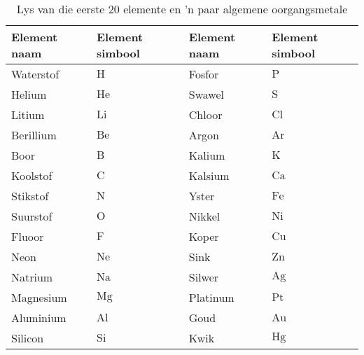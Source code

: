 \begin{table}[h!]
\label{tab:elements}
\begin{center}
\begin{tabular}{|l|l|l|l|}\hline
\textbf{Element naam} & \textbf{Element simbool} & \textbf{Element naam} & \textbf{Element simbool} \\ \hline
Waterstof & $\text{H}$ & Fosfor & $\text{P}$  \\ \hline
Helium & $\text{He}$ & Swawel & $\text{S}$ \\ \hline
Litium & $\text{Li}$ & Chloor & $\text{Cl}$ \\ \hline
Berillium & $\text{Be}$ & Argon & $\text{Ar}$ \\ \hline 
Boor & $\text{B}$ & Kalium & $\text{K}$ \\ \hline
Koolstof & $\text{C}$ & Kalsium & $\text{Ca}$ \\ \hline 
Stikstof & $\text{N}$ & Yster & $\text{Fe}$ \\ \hline
Suurstof & $\text{O}$ & Nikkel & $\text{Ni}$ \\ \hline 
Fluoor & $\text{F}$ & Koper & $\text{Cu}$ \\ \hline
Neon & $\text{Ne}$  & Sink & $\text{Zn}$ \\ \hline
Natrium & $\text{Na}$  & Silwer & $\text{Ag}$ \\ \hline
Magnesium & $\text{Mg}$  & Platinum & $\text{Pt}$ \\ \hline
Aluminium & $\text{Al}$ & Goud & $\text{Au}$ \\ \hline
Silicon & $\text{Si}$ & Kwik & $\text{Hg}$  \\ \hline
\end{tabular}
\end{center}
\caption{Lys van die eerste 20 elemente en 'n paar algemene oorgangsmetale}
\end{table}
\par 


      \label{m38708*uid26}
